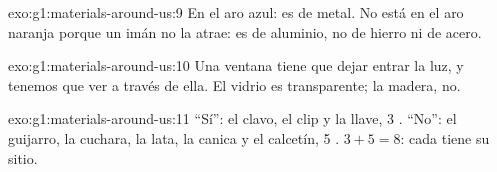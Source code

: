 \begin{solution}{exo:g1:materials-around-us:9}
En el aro azul: es de metal. No está en el aro naranja porque un imán
no la atrae: es de aluminio, no de hierro ni de acero.
\end{solution}

\begin{solution}{exo:g1:materials-around-us:10}
Una ventana tiene que dejar entrar la luz, y tenemos que ver a través
de ella. El vidrio es transparente; la madera, no.
\end{solution}

\begin{solution}{exo:g1:materials-around-us:11}
``Sí'': el clavo, el clip y la llave, 3 . ``No'': el guijarro,
la cuchara, la lata, la canica y el calcetín, 5 .
$3 + 5 = 8$: cada  tiene su sitio.
\end{solution}
